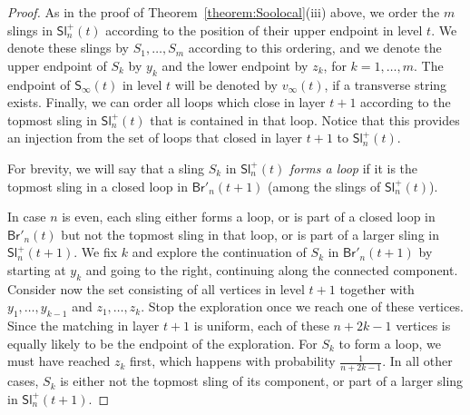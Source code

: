 \documentclass[a4paper,11pt,reqno]{amsart}
\newcommand{\paul}[1]{\todo[color=yellow!70,inline]{Paul: #1}}
\newcommand{\fabian}[1]{\todo[color=red!50,inline]{Fabian: #1}}
\newcommand{\Br}{\mathsf{Br}}
\newcommand{\Slr}{\mathsf{Sl}^+}
\newcommand{\Soo}{\mathsf{S}_\infty}
\theoremstyle{definition}
\begin{document}
\begin{proof}
 As in the proof of Theorem~\ref{theorem:Soolocal}(iii) above, we order the $m$ slings in $\Slr_n(t)$ according to the position of their upper endpoint in level $t$. We denote these slings by $S_1,\dots,S_m$ according to this ordering, and we denote the upper endpoint of $S_k$ by $y_k$ and the lower endpoint by $z_k$, for $k=1,\dots,m$. The endpoint of $\Soo(t)$ in level $t$ will be denoted by $v_\infty(t)$, if a transverse string exists. 
 Finally, we can order all loops which close in layer $t+1$ according to the topmost sling in $\Slr_n(t)$ that is contained in that loop. Notice that this provides an injection from the set of loops that closed in layer $t+1$ to $\Slr_n(t)$. 
 
 For brevity, we will say that a sling $S_k$ in $\Slr_n(t)$ \emph{forms a loop} if it is the topmost sling in a closed loop in $\Br'_n(t+1)$ (among the slings of $\Slr_n(t)$). 
 
 In case $n$ is even, each sling either forms a loop, or is part of a closed loop in $\Br'_n(t)$ but not the topmost sling in that loop, or is part of a larger sling in $\Slr_n(t+1)$. 
 We fix $k$ and explore the continuation of $S_k$ in $\Br'_n(t+1)$ by starting at $y_k$ and going to the right, continuing along the connected component. Consider now the set consisting of all vertices in level $t+1$ together with $y_1,\dots,y_{k-1}$ and $z_1,\dots,z_k$. Stop the exploration once we reach one of these vertices. Since the matching in layer $t+1$ is uniform, each of these $n+2k-1$ vertices is equally likely to be the endpoint of the exploration. For $S_k$ to form a loop, we must have reached $z_k$ first, which happens with probability $\frac{1}{n+2k-1}$. In all other cases, $S_k$ is either not the topmost sling of its component, or part of a larger sling in $\Slr_n(t+1)$. 
 

\end{proof}
\end{document}
